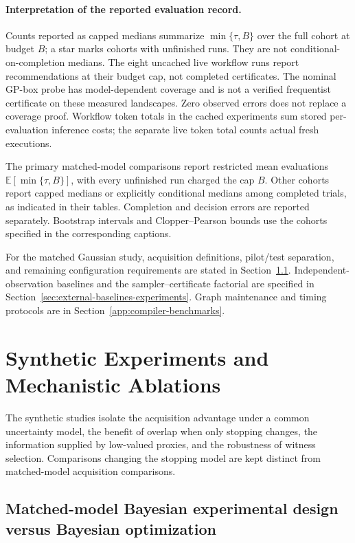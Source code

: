 \documentclass{article}
\theoremstyle{plain}
\theoremstyle{definition}
\begin{document}
\paragraph{Interpretation of the reported evaluation record.}
Counts reported as capped medians summarize $\min\{\tau,B\}$ over the full
cohort at budget $B$; a star marks cohorts with unfinished runs. They are
not conditional-on-completion medians. The eight uncached live workflow
runs report recommendations at their budget cap, not completed certificates.
The nominal GP-box probe has model-dependent coverage and is not a verified
frequentist certificate on these measured landscapes. Zero observed errors
does not replace a coverage proof. Workflow token totals in the cached
experiments sum stored per-evaluation inference costs; the separate live
token total counts actual fresh executions.

The primary matched-model comparisons report restricted mean evaluations $\mathbb E[\min\{\tau,B\}]$, with every unfinished run charged the cap $B$. Other cohorts report capped medians or explicitly conditional medians among completed trials, as indicated in their tables. Completion and decision errors are reported separately. Bootstrap intervals and Clopper--Pearson bounds use the cohorts specified in the corresponding captions.

For the matched Gaussian study, acquisition definitions, pilot/test separation, and remaining configuration requirements are stated in Section~\ref{app:v12-bed}. Independent-observation baselines and the sampler--certificate factorial are specified in Section~\ref{sec:external-baselines-experiments}. Graph maintenance and timing protocols are in Section~\ref{app:compiler-benchmarks}.

\clearpage

\section{Synthetic Experiments and Mechanistic Ablations}
\label{app:group-results}\label{app:correlated-expanded}

The synthetic studies isolate the acquisition advantage under a common uncertainty model, the benefit of overlap when only stopping changes, the information supplied by low-valued proxies, and the robustness of witness selection. Comparisons changing the stopping model are kept distinct from matched-model acquisition comparisons.

\subsection{Matched-model Bayesian experimental design versus Bayesian optimization}
\label{app:v12-bed}
\end{document}
